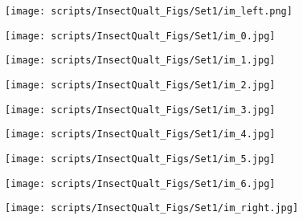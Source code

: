 \documentclass[10pt,twocolumn,letterpaper]{article}
\begin{document}
\begin{figure*}[t]
    \begin{center}
    \begin{subfigure}[b]{0.1\textwidth}
        \centering
        \texttt{[image: scripts/InsectQualt\_Figs/Set1/im\_left.png]}
    \end{subfigure}
    \hfill
    \begin{subfigure}[b]{0.1\textwidth}
        \centering
        \texttt{[image: scripts/InsectQualt\_Figs/Set1/im\_0.jpg]}
    \end{subfigure}
    \hfill
    \begin{subfigure}[b]{0.1\textwidth}
        \centering
        \texttt{[image: scripts/InsectQualt\_Figs/Set1/im\_1.jpg]}
    \end{subfigure}
    \hfill
    \begin{subfigure}[b]{0.1\textwidth}
        \centering
        \texttt{[image: scripts/InsectQualt\_Figs/Set1/im\_2.jpg]}
    \end{subfigure}
    \hfill
    \begin{subfigure}[b]{0.1\textwidth}
        \centering
        \texttt{[image: scripts/InsectQualt\_Figs/Set1/im\_3.jpg]}
    \end{subfigure}
    \hfill
    \begin{subfigure}[b]{0.1\textwidth}
        \centering
        \texttt{[image: scripts/InsectQualt\_Figs/Set1/im\_4.jpg]}
    \end{subfigure}
    \hfill
    \begin{subfigure}[b]{0.1\textwidth}
        \centering
        \texttt{[image: scripts/InsectQualt\_Figs/Set1/im\_5.jpg]}
    \end{subfigure}
    \hfill
    \begin{subfigure}[b]{0.1\textwidth}
        \centering
        \texttt{[image: scripts/InsectQualt\_Figs/Set1/im\_6.jpg]}
    \end{subfigure}
    \hfill
    \begin{subfigure}[b]{0.1\textwidth}
        \centering
        \texttt{[image: scripts/InsectQualt\_Figs/Set1/im\_right.jpg]}
    \end{subfigure}
    



\end{center}
\end{figure*}
\end{document}
